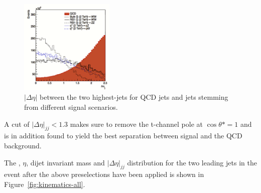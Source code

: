 \begin{figure}[h!]
\centering
\includegraphics[width=0.4\textwidth]{figures/analysis/search1/misc/deta_opt.png}
\caption{ $|\Delta\eta|$  between the two highest-\PT jets for QCD jets and jets stemming from different signal scenarios.}
\label{fig:searchI:detaopt}
\end{figure}
 
A cut of $|\Delta \eta|_{jj}<1.3$ makes sure to remove the t-channel pole at $\cos \theta* = 1$ and is in addition found to yield the best separation between signal and the QCD background.
%
%

The \PT, $\eta$, dijet invariant mass and $|\Delta \eta|_{jj}$ distribution for the two leading jets in the event after the above preselections have been applied is shown in Figure~\ref{fig:kinematics-all}.

